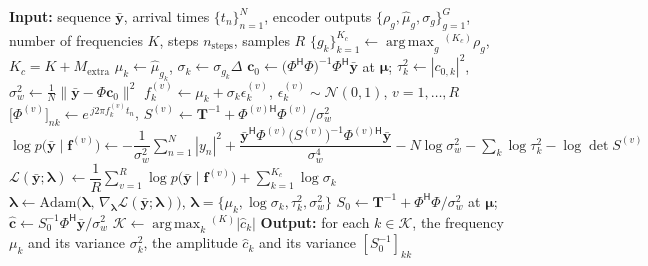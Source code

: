 \documentclass[journal,onecolumn]{IEEEtran}
\begin{document}
\begin{algorithm}[t]
\caption{Per-instance variational learning}
\label{alg:refine}
\begin{algorithmic}[1]
\State \textbf{Input:} sequence $\bar{\mathbf{y}}$, arrival times $\{t_n\}_{n=1}^{N}$, encoder outputs $\{\rho_g,\hat\mu_g,\sigma_g\}_{g=1}^{G}$, number of frequencies $K$, steps $n_{\mathrm{steps}}$, samples $R$
\State $\{g_k\}_{k=1}^{K_c}\gets\operatorname*{arg\,max}_{g}{}^{(K_c)}\rho_g$, \quad $K_c=K+M_{\mathrm{extra}}$ 
\State $\mu_k\gets\hat\mu_{g_k}$, \quad $\sigma_k\gets\sigma_{g_k}\Delta$ 
\State $\mathbf{c}_0\gets\big(\Phi^{\mathsf H}\Phi\big)^{-1}\Phi^{\mathsf H}\bar{\mathbf{y}}$ at $\pmb{\mu}$; \quad $\tau_k^2\gets|c_{0,k}|^2$, \quad $\sigma_w^2\gets\tfrac1N\|\bar{\mathbf{y}}-\Phi\mathbf{c}_0\|^2$ 
  \State $f_k^{(v)}\gets\mu_k+\sigma_k\epsilon_k^{(v)}$, \quad $\epsilon_k^{(v)}\sim\mathcal{N}(0,1)$, \quad $v=1,\dots,R$ 
  \State $\big[\Phi^{(v)}\big]_{nk}\gets e^{\,j2\pi f_k^{(v)}t_n}$, \quad $S^{(v)}\gets\mathbf{T}^{-1}+\Phi^{(v)\mathsf H}\Phi^{(v)}/\sigma_w^2$ 
  \State $\log p\big(\bar{\mathbf{y}}\mid\mathbf{f}^{(v)}\big)\gets-\dfrac{1}{\sigma_w^2}\displaystyle\sum_{n=1}^{N}|y_n|^2+\dfrac{\bar{\mathbf{y}}^{\mathsf H}\Phi^{(v)}\big(S^{(v)}\big)^{-1}\Phi^{(v)\mathsf H}\bar{\mathbf{y}}}{\sigma_w^4}
  -N\log\sigma_w^2-\displaystyle\sum_k\log\tau_k^2-\log\det S^{(v)}$ 
  \State $\mathcal{L}(\bar{\mathbf{y}};\pmb{\lambda})\gets\dfrac1R\displaystyle\sum_{v=1}^{R}\log p\big(\bar{\mathbf{y}}\mid\mathbf{f}^{(v)}\big)+\sum_{k=1}^{K_c}\log\sigma_k$ 
  \State $\pmb{\lambda}\gets\mathrm{Adam}\big(\pmb{\lambda},\,\nabla_{\pmb{\lambda}}\mathcal{L}(\bar{\mathbf{y}};\pmb{\lambda})\big)$, \quad $\pmb{\lambda}=\{\mu_k,\log\sigma_k,\tau_k^2,\sigma_w^2\}$ 
\EndFor
\State $S_0\gets\mathbf{T}^{-1}+\Phi^{\mathsf H}\Phi/\sigma_w^2$ at $\pmb{\mu}$; \quad $\hat{\mathbf{c}}\gets S_0^{-1}\Phi^{\mathsf H}\bar{\mathbf{y}}/\sigma_w^2$ 
\State $\mathcal{K}\gets\operatorname*{arg\,max}_{k}{}^{(K)}|\hat c_k|$ 
\State \textbf{Output:} for each $k\in\mathcal{K}$, the frequency $\mu_k$ and its variance $\sigma_k^2$, the amplitude $\hat c_k$ and its variance $[S_0^{-1}]_{kk}$
\end{algorithmic}
\end{algorithm}
\end{document}
